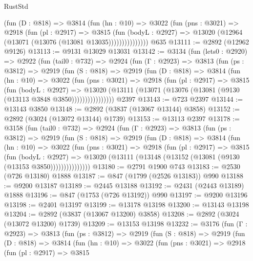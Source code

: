 \begin{lexlean}{RustStd}
\begin{coremodule}
                (fun (D : @818) =>
                @3814
                  (fun (hn : @10) =>
                  @3022
                    (fun (pns : @3021) =>
                    @2918
                      (fun (pl : @2917) =>
                      @3815
                        (fun (bodyL : @2927) =>
                        @13020 (@12964 (@13071 (@13076 (@13081 @13035)))))))))))))))
    @635
@13111 := @2892 (@12962 @9126)
@13113 := @9131 @13029 @13031
@13142 := @3134
    (fun (lets0 : @2920) =>
    @2922
      (fun (tail0 : @732) =>
      @2924
        (fun (Γ : @2923) =>
        @3813
          (fun (ps : @3812) =>
          @2919
            (fun (S : @818) =>
            @2919
              (fun (D : @818) =>
              @3814
                (fun (hn : @10) =>
                @3022
                  (fun (pns : @3021) =>
                  @2918
                    (fun (pl : @2917) =>
                    @3815
                      (fun (bodyL : @2927) =>
                      @13020
                        (@13111 (@13071 (@13076 (@13081 (@9130 (@13113 @3848 @3850))))))))))))))))
    @2397
@13143 := @723 @2397
@13144 := @13143 @3850
@13148 := @2892 (@3837 (@13067 @13144) @3858)
@13152 := @2892 (@3024 (@13072 @13144) @1739)
@13153 := @13113 @2397
@13178 := @3158
    (fun (tail0 : @732) =>
    @2924
      (fun (Γ : @2923) =>
      @3813
        (fun (ps : @3812) =>
        @2919
          (fun (S : @818) =>
          @2919
            (fun (D : @818) =>
            @3814
              (fun (hn : @10) =>
              @3022
                (fun (pns : @3021) =>
                @2918
                  (fun (pl : @2917) =>
                  @3815
                    (fun (bodyL : @2927) =>
                    @13020 (@13111 (@13148 (@13152 (@13081 (@9130 (@13153 @3850)))))))))))))))
@13180 := @2791 @1900 @743
@13183 := @2530 (@726 @13180) @1888
@13187 := @847 (@1799 (@2526 @13183)) @990
@13188 := @9200 @13187
@13189 := @2445 @13188
@13192 := @2431 (@2443 @13189) @1888
@13196 := @847 (@1753 (@726 @13192)) @990
@13197 := @9200 @13196
@13198 := @2401 @13197
@13199 := @13178 @13198
@13200 := @13143 @13198
@13204 := @2892 (@3837 (@13067 @13200) @3858)
@13208 := @2892 (@3024 (@13072 @13200) @1739)
@13209 := @13153 @13198
@13232 := @3176
    (fun (Γ : @2923) =>
    @3813
      (fun (ps : @3812) =>
      @2919
        (fun (S : @818) =>
        @2919
          (fun (D : @818) =>
          @3814
            (fun (hn : @10) =>
            @3022
              (fun (pns : @3021) =>
              @2918
                (fun (pl : @2917) =>
                @3815

\end{coremodule}
\end{lexlean}
